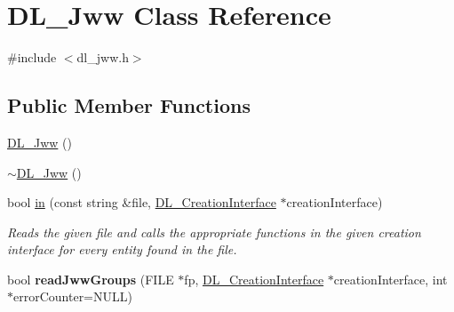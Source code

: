 \hypertarget{classDL__Jww}{\section{D\-L\-\_\-\-Jww Class Reference}
\label{classDL__Jww}
}


{\ttfamily \#include $<$dl\-\_\-jww.\-h$>$}

\subsection*{Public Member Functions}
\begin{DoxyCompactItemize}
\item 
\hyperlink{classDL__Jww_a72c0332a88b20baf3ee396f5e5ca5eff}{D\-L\-\_\-\-Jww} ()
\item 
\hyperlink{classDL__Jww_aa3e4099dc71d093b8a163b08c182dedf}{$\sim$\-D\-L\-\_\-\-Jww} ()
\item 
bool \hyperlink{classDL__Jww_a08c6ea45c58369fa8082fe085ac7c515}{in} (const string \&file, \hyperlink{classDL__CreationInterface}{D\-L\-\_\-\-Creation\-Interface} $\ast$creation\-Interface)
\begin{DoxyCompactList}\small\item\em Reads the given file and calls the appropriate functions in the given creation interface for every entity found in the file. \end{DoxyCompactList}\item 
\hypertarget{classDL__Jww_a8bf33184cd773ac09d91e14a4a9f8e9c}{bool {\bfseries read\-Jww\-Groups} (F\-I\-L\-E $\ast$fp, \hyperlink{classDL__CreationInterface}{D\-L\-\_\-\-Creation\-Interface} $\ast$creation\-Interface, int $\ast$error\-Counter=N\-U\-L\-L)}\label{classDL__Jww_a8bf33184cd773ac09d91e14a4a9f8e9c}


\end{DoxyCompactItemize}
